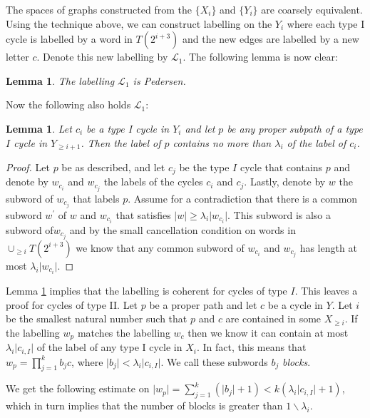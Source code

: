 \documentclass[11pt,a4paper]{amsart}
\theoremstyle{plain}
\newtheorem{lemma}[theorem]{Lemma}%
\theoremstyle{definition}%
\theoremstyle{remark}%
\begin{document}
The spaces of graphs constructed from the $\lbrace X_{i} \rbrace$ and $\lbrace Y_{i} \rbrace$ are coarsely equivalent. Using the technique above, we can construct labelling on the $Y_{i}$ where each type I cycle is labelled by a word in $T(2^{i+3})$ and the new edges are labelled by a new letter $c$. Denote this new labelling by $\mathcal{L}_{1}$. The following lemma is now clear:

\begin{lemma}\label{lem:modpedersen}
The labelling $\mathcal{L}_{1}$ is Pedersen. 
\end{lemma}

Now the following also holds $\mathcal{L}_{1}$:

\begin{lemma}\label{lem:shortcoherent}
Let $c_{i}$ be a type I cycle in $Y_{i}$ and let $p$ be any proper subpath of a type $I$ cycle in $Y_{\geq i+1}$. Then the label of $p$ contains no more than $\lambda_{i}$ of the label of $c_{i}$. 
\end{lemma}
\begin{proof}
Let $p$ be as described, and let $c_{j}$ be the type $I$ cycle that contains $p$ and denote by $w_{c_{i}}$ and $w_{c_{j}}$ the labels of the cycles $c_{i}$ and $c_{j}$. Lastly, denote by $w$ the subword of $w_{c_{j}}$ that labels $p$. Assume for a contradiction that there is a common subword $w^{'}$ of $w$ and $w_{c_{i}}$ that satisfies $\vert w\vert \geq\lambda_{i} \vert w_{c_{i}} \vert$. This subword is also a subword of$w_{c_{j}}$ and by the small cancellation condition on words in $\cup_{\geq i} T(2^{i+3})$ we know that any common subword of $w_{c_{i}}$ and $w_{c_{j}}$ has length at most $\lambda_{i} \vert w_{c_{i}} \vert$. 
\end{proof}

Lemma \ref{lem:shortcoherent} implies that the labelling is coherent for cycles of type $I$. This leaves a proof for cycles of type II. Let $p$ be a proper path and let $c$ be a cycle in $Y$. Let $i$ be the smallest natural number such that $p$ and $c$ are contained in some $X_{\geq i}$. If the labelling $w_{p}$ matches the labelling $w_{c}$ then we know it can contain at most $\lambda_{i}\vert c_{i,I} \vert$ of the label of any type I cycle in $X_{i}$. In fact, this means that $w_{p}=\prod_{j=1}^{k}b_{j}c$, where $\vert b_{j} \vert < \lambda_{i}\vert c_{i,I} \vert$. We call these subwords $b_{j}$ \textit{blocks}.

We get the following estimate on $\vert w_{p} \vert = \sum_{j=1}^{k} (\vert b_{j} \vert +1) < k(\lambda_{i}\vert c_{i,I} \vert +1)$, which in turn implies that the number of blocks is greater than $1\backslash \lambda_{i}$.
\end{document}
